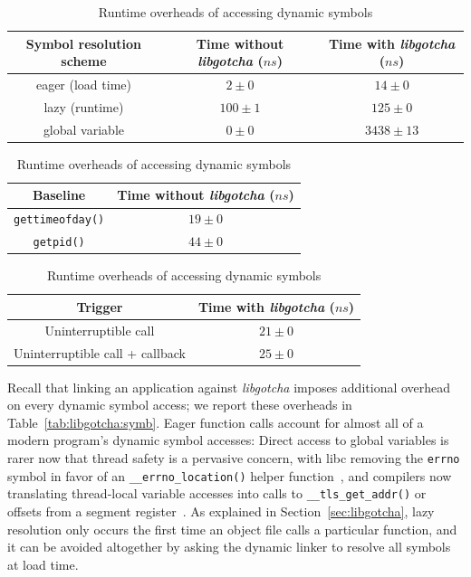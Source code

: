 \begin{table}
	\begin{minipage}{2\columnwidth}
	\centering
	\begin{tabular}{c | c c}
	Symbol resolution scheme & Time without \textit{libgotcha} ($ns$) & Time with \textit{libgotcha} ($ns$) \\
	\hline
	eager (load time) & $2 \pm 0$ & $14 \pm 0$ \\
	lazy (runtime) & $100 \pm 1$ & $125 \pm 0$ \\
	global variable & $0 \pm 0$ & $3438 \pm 13$
	\end{tabular}
	\label{tab:libgotcha:symb}
	\end{minipage}

	\begin{minipage}{\columnwidth}
	\centering
	\begin{tabular}{c | c}
	Baseline & Time without \textit{libgotcha} ($ns$) \\
	\hline
	\texttt{gettimeofday()} & $19 \pm 0$ \\
	\texttt{getpid()} & $44 \pm 0$
	\end{tabular}
	\label{tab:libgotcha:baseline}
	\end{minipage}
%
	\begin{minipage}{\columnwidth}
	\centering
	\begin{tabular}{c | c}
	Trigger & Time with \textit{libgotcha} ($ns$) \\
	\hline
	Uninterruptible call & $21 \pm 0$ \\
	Uninterruptible call + callback & $25 \pm 0$
	\end{tabular}
	\label{tab:libgotcha:whitelist}
	\end{minipage}
\caption{Runtime overheads of accessing dynamic symbols}
\end{table}

Recall that linking an application against \textit{libgotcha} imposes additional
overhead on every dynamic symbol access; we report these overheads in
Table~\ref{tab:libgotcha:symb}.  Eager function calls account for almost all of a
modern program's dynamic symbol accesses:  Direct access to global variables is rarer
now that thread safety is a pervasive concern, with libc removing the \texttt{errno}
symbol in favor of an \texttt{\_\_errno\_location()} helper
function~\cite{www-lsb-errno}, and compilers now translating thread-local variable
accesses into calls to \texttt{\_\_tls\_get\_addr()} or offsets from a segment
register~\cite{drepper:spec2013}.  As explained in Section~\ref{sec:libgotcha}, lazy
resolution only occurs the first time an object file calls a particular function, and
it can be avoided altogether by asking the dynamic linker to resolve all symbols at
load time.

